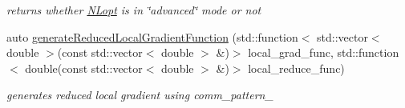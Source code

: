 \begin{DoxyCompactItemize}
\begin{DoxyCompactList}\small\item\em returns whether \hyperlink{classop_1_1NLopt}{N\-Lopt} is in \char`\"{}advanced\char`\"{} mode or not \end{DoxyCompactList}\item 
\hypertarget{classop_1_1NLopt_a94355fcd880ccac99e0056c2950289fa}{auto \hyperlink{classop_1_1NLopt_a94355fcd880ccac99e0056c2950289fa}{generate\-Reduced\-Local\-Gradient\-Function} (std\-::function$<$ std\-::vector$<$ double $>$(const std\-::vector$<$ double $>$ \&)$>$ local\-\_\-grad\-\_\-func, std\-::function$<$ double(const std\-::vector$<$ double $>$ \&)$>$ local\-\_\-reduce\-\_\-func)}\label{classop_1_1NLopt_a94355fcd880ccac99e0056c2950289fa}

\begin{DoxyCompactList}\small\item\em generates reduced local gradient using comm\-\_\-pattern\-\_\- \end{DoxyCompactList}\end{DoxyCompactItemize}
